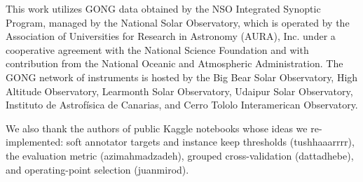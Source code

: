 \documentclass[sigconf]{acmart}
\begin{document}
    This work utilizes GONG data obtained by the NSO Integrated Synoptic Program, managed by the National Solar Observatory, which is operated by the Association of Universities for Research in Astronomy (AURA), Inc. under a cooperative agreement with the National Science Foundation and with contribution from the National Oceanic and Atmospheric Administration. The GONG network of instruments is hosted by the Big Bear Solar Observatory, High Altitude Observatory, Learmonth Solar Observatory, Udaipur Solar Observatory, Instituto de Astrofísica de Canarias, and Cerro Tololo Interamerican Observatory.

    We also thank the authors of public Kaggle notebooks whose ideas we re-implemented: soft annotator targets and instance keep thresholds (tushhaaarrrr), the evaluation metric (azimahmadzadeh), grouped cross-validation (dattadhebe), and operating-point selection (juanmirod).



\end{document}
